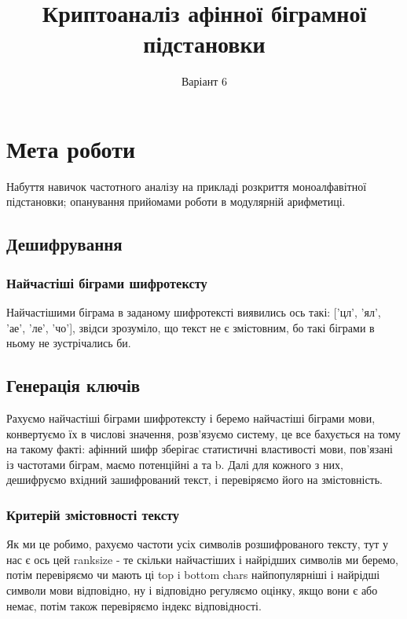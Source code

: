 \documentclass[12pt]{article}
\title{\textbf{Криптоаналіз афінної біграмної підстановки}}
\author{Варіант 6}
\date{}
\begin{document}
\maketitle
\section{Мета роботи}
\quad Набуття навичок частотного аналізу на прикладі розкриття моноалфавітної підстановки; опанування прийомами роботи в модулярній арифметиці.
        
    
\subsection{Дешифрування}
\subsubsection{Найчастіші біграми шифротексту}
Найчастішими біграма в заданому шифротексті виявились ось такі: ['цл', 'ял', 'ае', 'ле', 'чо'], звідси зрозуміло, що текст не є змістовним, бо такі біграми в ньому не зустрічались би.

\subsection{Генерація ключів}
\quad Рахуємо найчастіші біграми шифротексту і беремо найчастіші біграми мови, конвертуємо їх в числові значення, 
розв'язуємо систему, це все бахується на тому на такому факті: афінний шифр зберігає статистичні властивості мови, пов’язані із частотами біграм, маємо потенційні а та b.
Далі для кожного з них, дешифруємо вхідний зашифрований текст, і перевіряємо його на змістовність.

\subsubsection{Критерій змістовності тексту}
\quad Як ми це робимо, рахуємо частоти усіх символів розшифрованого тексту, тут у нас є ось цей ranksize - те скільки найчастіших і найрідших символів ми беремо, потім перевіряємо чи мають ці top i bottom chars найпопулярніші і найрідші символи мови відповідно, ну і відповідно регуляємо оцінку, якщо вони є або немає, потім також перевіряємо індекс відповідності.

\newpage
\end{document}
